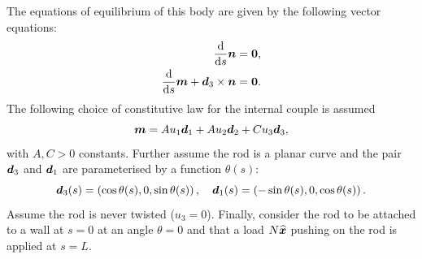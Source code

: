\documentclass[a4paper,12pt]{article}
\begin{document}
The equations of equilibrium of this body are given by the following vector equations:
\begin{align}
\label{mechanics}
\fd{}{s}\v{n}&= {\bf 0},\\
\nonumber \fd{}{s}\v{m}  +\v{d}_3 \times\v{n} &={\bf 0}.
\end{align}
The following choice of constitutive law for the internal couple is assumed
\begin{equation*}
\v{m} =  A u_1\v{d}_1 + A u_2\v{d}_2 +C u_3\v{d}_3,
\end{equation*}
with $A,C>0$ constants. Further assume the rod is a planar curve and the pair  $\v{d}_3$ and $\v{d}_1$ are parameterised by a function $\theta(s)$:
\begin{equation*}
\v{d}_3(s) = \left(\cos\theta(s),0,\sin\theta(s)\right),\quad \v{d}_1(s) = \left(-\sin\theta(s),0,\cos\theta(s)\right).
\end{equation*} 
Assume the rod is never twisted ($u_3=0$). Finally, consider the rod to be attached to a wall at $s=0$ at an angle $\theta=0$ and that a load $N \uv{x}$ pushing on the rod is applied at $s=L$.
\end{document}
